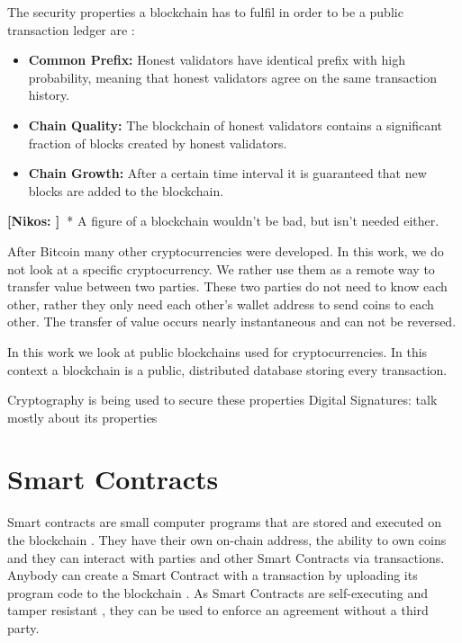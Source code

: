 \documentclass{cacthesis}
\newcommand{\authnote}[3]{{ \footnotesize \textbf{#1[#2: #3]~}}}
\newcommand{\niknote}[1]{\authnote{\color{red}}{Nikos}{#1}}
\begin{document}
The security properties a blockchain has to fulfil in order to be a public transaction ledger are \cite{bitcoin_backbone}:
\begin{itemize}
    \item \textbf{Common Prefix:} Honest validators have identical prefix with high probability, meaning that honest validators agree on the same transaction history.
    \item \textbf{Chain Quality:} The blockchain of honest validators contains a significant fraction of blocks created by honest validators.
    \item \textbf{Chain Growth:} After a certain time interval it is guaranteed that new blocks are added to the blockchain.
\end{itemize}

\niknote{}* A figure of a blockchain wouldn't be bad, but isn't needed either.  \newline

After Bitcoin many other cryptocurrencies were developed. In this work, we do not look at a specific cryptocurrency. We rather use them as a remote way to transfer value between two parties. These two parties do not need to know each other, rather they only need each other's wallet address to send coins to each other. The transfer of value occurs nearly instantaneous and can not be reversed.


In this work we look at public blockchains used for cryptocurrencies. In this context a blockchain is a public, distributed database storing every transaction. 

Cryptography is being used to secure these properties
Digital Signatures:\cite{Katz2020-aj} 
talk mostly about its properties
\section{Smart Contracts}
Smart contracts are small computer programs that are stored and executed on the blockchain \cite{chrisistidis}. They have their own on-chain address, the ability to own coins and they can interact with parties and other Smart Contracts via transactions. Anybody can create a Smart Contract with a transaction by uploading its program code to the blockchain \cite{narayanan2016bitcoin}. As Smart Contracts are self-executing and tamper resistant \citeauthor{sc18}, they can be used to enforce an agreement without a third party.\newline
\end{document}
